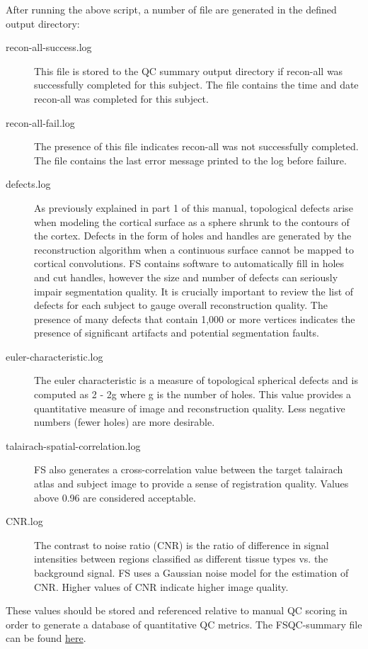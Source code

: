 \documentclass[paper=a4, fontsize=11pt]{scrartcl} %
\numberwithin{equation}{section} %
\numberwithin{figure}{section} %
\numberwithin{table}{section} %
\begin{document}
After running the above script, a number of file are generated in the defined output directory:

\begin{description}
\item[recon-all-success.log] This file is stored to the QC summary output directory if recon-all was successfully completed for this subject.  The file contains the time and date recon-all was completed for this subject.
\item[recon-all-fail.log] The presence of this file indicates recon-all was not successfully completed.  The file contains the last error message printed to the log before failure.
\item[defects.log] As previously explained in part 1 of this manual, topological defects arise when modeling the cortical surface as a sphere shrunk to the contours of the cortex. Defects in the form of holes and handles are generated by the reconstruction algorithm when a continuous surface cannot be mapped to cortical convolutions. FS contains software to automatically fill in holes and cut handles, however the size and number of defects can seriously impair segmentation quality.  It is crucially important to review the list of defects for each subject to gauge overall reconstruction quality.  The presence of many defects that contain 1,000 or more vertices indicates the presence of significant artifacts and potential segmentation faults.
\item[euler-characteristic.log]  The euler characteristic is a measure of topological spherical defects and is computed as 2 - 2g where g is the number of holes.  This value provides a quantitative measure of image and reconstruction quality.  Less negative numbers (fewer holes) are more desirable.
\item[talairach-spatial-correlation.log]  FS also generates a cross-correlation value between the target talairach atlas and subject image to provide a sense of registration quality.  Values above 0.96 are considered acceptable.
\item[CNR.log]  The contrast to noise ratio (CNR) is the ratio of difference in signal intensities between regions classified as different tissue types vs. the background signal.  FS uses a Gaussian noise model for the estimation of CNR.  Higher values of CNR indicate higher image quality.
\end{description}

These values should be stored and referenced relative to manual QC scoring in order to generate a database of quantitative QC metrics.  The FSQC-summary file can be found \href{https://www.dropbox.com/s/zmrrg61cxkqxafb/FSQC-summary.sh?dl=0}{here}.
\end{document}
